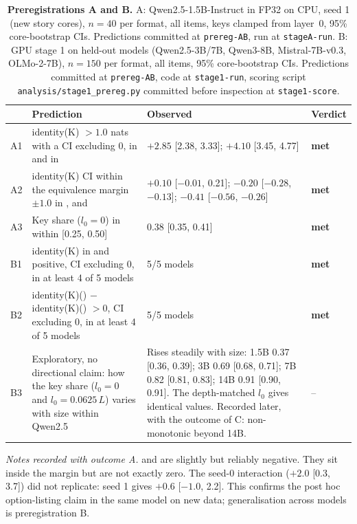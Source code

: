 \begin{table}[!ht]
\centering
\footnotesize
\caption{\textbf{Preregistrations A and B.} A: Qwen2.5-1.5B-Instruct in FP32 on CPU, seed 1 (new story cores), $n = 40$ per format, all items, keys clamped from layer~0, 95\% core-bootstrap CIs. Predictions committed at \texttt{prereg-AB}, run at \texttt{stageA-run}. B: GPU stage 1 on held-out models (Qwen2.5-3B/7B, Qwen3-8B, Mistral-7B-v0.3, OLMo-2-7B), $n = 150$ per format, all items, 95\% core-bootstrap CIs. Predictions committed at \texttt{prereg-AB}, code at \texttt{stage1-run}, scoring script \texttt{analysis/stage1\_prereg.py} committed before inspection at \texttt{stage1-score}.}
\label{tab:prereg-ab}
\begin{tabular}{p{}p{}p{}p{}}
\toprule
 & Prediction & Observed & Verdict \\
\midrule
A1 & identity(K) $> 1.0$ nats with a CI excluding 0, in \fmtOpt{} and in \fmtLetter{} & \fmtOpt{} $+2.85$ [2.38, 3.33]; \fmtLetter{} $+4.10$ [3.45, 4.77] & \textbf{met} \\
A2 & identity(K) CI within the equivalence margin $\pm 1.0$ in \fmtNone{}, \fmtBefore{} and \fmtPost{} & \fmtNone{} $+0.10$ [$-0.01$, 0.21]; \fmtBefore{} $-0.20$ [$-0.28$, $-0.13$]; \fmtPost{} $-0.41$ [$-0.56$, $-0.26$] & \textbf{met} \\
A3 & Key share ($l_0 = 0$) in \fmtOpt{} within [0.25, 0.50] & 0.38 [0.35, 0.41] & \textbf{met} \\
\midrule
B1 & identity(K) in \fmtOpt{} and \fmtLetter{} positive, CI excluding 0, in at least 4 of 5 models & 5/5 models & \textbf{met} \\
B2 & identity(K)(\fmtOpt{}) $-$ identity(K)(\fmtNone{}) $> 0$, CI excluding 0, in at least 4 of 5 models & 5/5 models & \textbf{met} \\
B3 & Exploratory, no directional claim: how the \fmtOpt{} key share ($l_0 = 0$ and $l_0 = 0.0625\,L$) varies with size within Qwen2.5 & Rises steadily with size: 1.5B 0.37 [0.36, 0.39]; 3B 0.69 [0.68, 0.71]; 7B 0.82 [0.81, 0.83]; 14B 0.91 [0.90, 0.91]. The depth-matched $l_0$ gives identical values. Recorded later, with the outcome of C: non-monotonic beyond 14B. & -- \\
\bottomrule
\end{tabular}

\smallskip
\begin{minipage}{0.94\textwidth}
\footnotesize
\emph{Notes recorded with outcome A.} \fmtBefore{} and \fmtPost{} are slightly but reliably negative. They sit inside the margin but are not exactly zero. The seed-0 \fmtLetter{} interaction ($+2.0$ [0.3, 3.7]) did not replicate: seed 1 gives $+0.6$ [$-1.0$, 2.2]. This confirms the post hoc option-listing claim in the same model on new data; generalisation across models is preregistration B.


\end{minipage}
\end{table}
